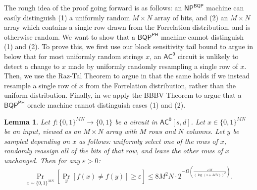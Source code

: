 \documentclass[11pt]{article}%
\newtheorem{lemma}[theorem]{Lemma}
\newcommand{\eps}{\varepsilon}
\begin{document}
The rough idea of the proof going forward is as follows: an $\mathsf{NP}^\mathsf{BQP}$ machine can easily distinguish (1) a uniformly random $M \times N$ array of bits, and (2) an $M \times N$ array which contains a single row drawn from the Forrelation distribution, and is otherwise random. We want to show that a $\mathsf{BQP}^\mathsf{PH}$ machine cannot distinguish (1) and (2). To prove this, we first use our block sensitivity tail bound to argue in  below that for most uniformly random strings $x$, an $\mathsf{AC^0}$ circuit is unlikely to detect a change to $x$ made by uniformly randomly resampling a single row of $x$. Then, we use the Raz-Tal Theorem to argue in  that the same holds if we instead resample a single row of $x$ from the Forrelation distribution, rather than the uniform distribution. Finally, in  we apply the BBBV Theorem to argue that a $\mathsf{BQP}^\mathsf{PH}$ oracle machine cannot distinguish cases (1) and (2).


\begin{lemma}
\label{lem:ac0_block_averaged_sensitivity_tail_bound}
Let $f: \{0,1\}^{MN} \to \{0,1\}$ be a circuit in $\mathsf{AC^0}[s, d]$. Let $x \in \{0,1\}^{MN}$ be an input, viewed as an $M \times N$ array with $M$ rows and $N$ columns. Let $y$ be sampled depending on $x$ as follows: uniformly select one of the rows of $x$, randomly reassign all of the bits of that row, and leave the other rows of $x$ unchanged. Then for any $\eps > 0$:
\[
\Pr_{x \sim \{0,1\}^{MN}}\left[\Pr_y\left[f(x) \neq f(y)\right] \ge \eps \right] \le 8M^2N \cdot 2^{-\Omega\left(\frac{\eps M}{(\log(s + MN))^d}\right)}.
\]
\end{lemma}
\end{document}
